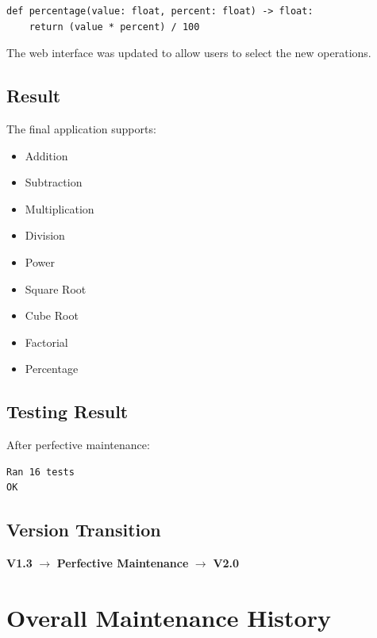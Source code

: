 \documentclass[12pt,a4paper,openany]{report}
\begin{document}
\begin{lstlisting}
def percentage(value: float, percent: float) -> float:
    return (value * percent) / 100
\end{lstlisting}

The web interface was updated to allow users to select the new
operations.

\section{Result}

The final application supports:

\begin{itemize}
    \item Addition
    \item Subtraction
    \item Multiplication
    \item Division
    \item Power
    \item Square Root
    \item Cube Root
    \item Factorial
    \item Percentage
\end{itemize}

\section{Testing Result}

After perfective maintenance:

\begin{verbatim}
Ran 16 tests
OK
\end{verbatim}

\section{Version Transition}

\begin{center}
\textbf{V1.3}
$\rightarrow$
\textbf{Perfective Maintenance}
$\rightarrow$
\textbf{V2.0}
\end{center}


\chapter{Overall Maintenance History}
\end{document}
